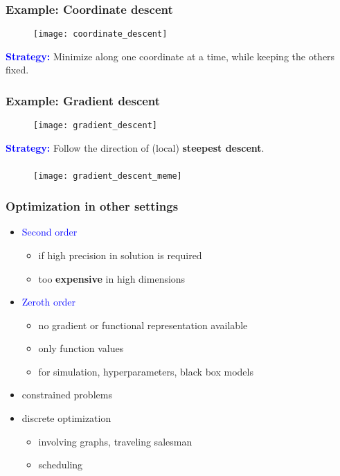 \documentclass{beamer}
\begin{document}
\begin{frame}
  \frametitle{Example: Coordinate descent}
  \begin{figure}[ht]
    \centering
    \texttt{[image: coordinate\_descent]}
  \end{figure}
  \textcolor{blue}{\textbf{Strategy:}} Minimize along one coordinate at a time, while keeping the others fixed.
\end{frame}


\begin{frame}
  \frametitle{Example: Gradient descent}
  \begin{figure}[ht]
    \centering
    \texttt{[image: gradient\_descent]}
  \end{figure}
  \textcolor{blue}{\textbf{Strategy:}} Follow the direction of (local) \textbf{steepest descent}.
\end{frame}


\begin{frame}
  \frametitle{}
  \begin{figure}[ht]
    \centering
    \texttt{[image: gradient\_descent\_meme]}
    \caption{\label{fig:label} }
  \end{figure}
\end{frame}

\begin{frame}
  \frametitle{Optimization in other settings}
  \begin{itemize}
    \item \textcolor{blue}{Second order}
          \begin{itemize}
            \item if high precision in solution is required
            \item too \textbf{expensive} in high dimensions
          \end{itemize}
    \item \textcolor{blue}{Zeroth order}
          \begin{itemize}
             \item no gradient or functional representation available
             \item only function values
             \item for simulation, hyperparameters, black box models
          \end{itemize}
    \item constrained problems
    \item discrete optimization
          \begin{itemize}
            \item involving graphs, traveling salesman
            \item scheduling
          \end{itemize}
  \end{itemize}
\end{frame}
\end{document}
